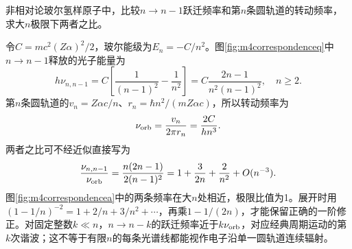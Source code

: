 \begin{example}\label{ex:m4correspondence}
非相对论玻尔氢样原子中，比较$n\to n-1$跃迁频率和第$n$条圆轨道的转动频率，求大$n$极限下两者之比。
\end{example}
\begin{solution}
令$C=mc^2(Z\alpha)^2/2$，玻尔能级为$E_n=-C/n^2$。图\ref{fig:m4correspondenceq}中$n\to n-1$释放的光子能量为
\[
 h\nu_{n,n-1}=C\left[\frac1{(n-1)^2}-\frac1{n^2}\right]
 =C\frac{2n-1}{n^2(n-1)^2},\quad n\geq2.
\]
第$n$条圆轨道的$v_n=Z\alpha c/n$、$r_n=\hbar n^2/(mZ\alpha c)$，所以转动频率为
\[
 \nu_{\rm orb}=\frac{v_n}{2\pi r_n}=\frac{2C}{hn^3}.
\]
两者之比可不经近似直接写为
\[
 \frac{\nu_{n,n-1}}{\nu_{\rm orb}}
 =\frac{n(2n-1)}{2(n-1)^2}
 =1+\frac{3}{2n}+\frac{2}{n^2}+O(n^{-3}).
\]
图\ref{fig:m4correspondencea}中的两条频率在大$n$处相近，极限比值为1。展开时用$(1-1/n)^{-2}=1+2/n+3/n^2+\cdots$，再乘$1-1/(2n)$，才能保留正确的一阶修正。对固定整数$k\ll n$，$n\to n-k$的跃迁频率近于$k\nu_{\rm orb}$，对应经典周期运动的第$k$次谐波；这不等于有限$n$的每条光谱线都能视作电子沿单一圆轨道连续辐射。
\end{solution}

